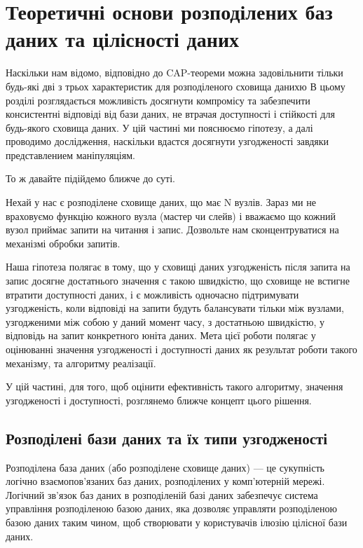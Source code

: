 \documentclass[14pt]{vakthesis}
\begin{document}
\chapter{Теоретичні основи розподілених баз даних та цілісності даних}

Наскільки нам відомо, відповідно до CAP-теореми можна задовільнити тільки будь-які дві з трьох характеристик
для розподіленого сховища данихю
В цьому розділі розглядається можливість досягнути компромісу та забезпечити консистентні відповіді 
від бази даних, не втрачая доступності і стійкості для будь-якого сховища даних.
У цій частині ми пояснюємо гіпотезу, а далі проводимо дослідження, наскільки вдастся досягнути узгодженості завдяки
представлением маніпуляціям.

То ж давайте підійдемо ближче до суті.

Нехай у нас є розподілене сховище даних, що має N вузлів. Зараз ми не враховуємо функцію кожного вузла (мастер чи слейв) і 
вважаємо що кожний вузол приймає запити на читання і запис. Дозвольте нам сконцентруватися на механізмі обробки запитів.

Наша гіпотеза полягає в тому, що у сховищі даних узгодженість після запита на запис досягне достатнього значення с такою швидкістю, що сховище не встигне втратити доступності даних, і є можливість одночасно підтримувати узгодженість, коли відповіді на запити будуть балансувати тільки між вузлами, узгодженими між собою у даний момент часу, з достатньою швидкістю, у відповідь на запит конкретного юніта даних.
Мета цієї роботи полягає у оцінюванні значення узгодженості і доступності даних як результат роботи такого механізму, та алгоритму реалізації.

У цій частині, для того, щоб оцінити ефективність такого алгоритму, значення узгодженості і доступності, розглянемо ближче концепт цього рішення.
\section{Розподілені бази даних та їх типи узгодженості}

Розподілена база даних (або розподілене сховище даних) — це сукупність логічно взаємопов'язаних баз даних, розподілених у комп'ютерній мережі. Логічний зв'язок баз даних в розподіленій базі даних забезпечує система управління розподіленою базою даних, яка дозволяє управляти розподіленою базою даних таким чином, щоб створювати у користувачів ілюзію цілісної бази даних. 
\end{document}
